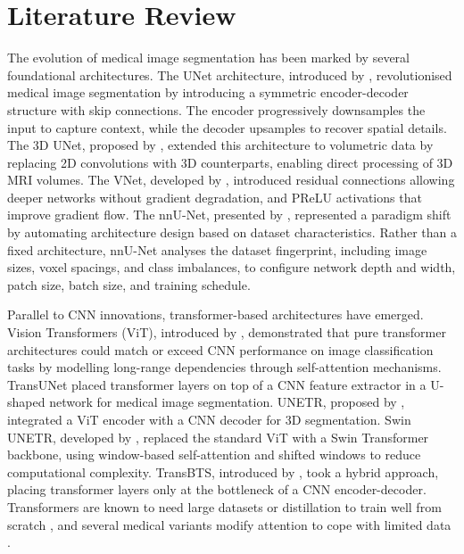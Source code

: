 \documentclass[a4paper,fleqn]{cas-sc}
\begin{document}
\section{Literature Review}
\label{sec:lit}

The evolution of medical image segmentation has been marked by several foundational architectures. The UNet architecture, introduced by \citet{ronneberger2015}, revolutionised medical image segmentation by introducing a symmetric encoder-decoder structure with skip connections. The encoder progressively downsamples the input to capture context, while the decoder upsamples to recover spatial details. The 3D UNet, proposed by \citet{cicek2016}, extended this architecture to volumetric data by replacing 2D convolutions with 3D counterparts, enabling direct processing of 3D MRI volumes. The VNet, developed by \citet{milletari2016}, introduced residual connections allowing deeper networks without gradient degradation, and PReLU activations that improve gradient flow. The nnU-Net, presented by \citet{isensee2021}, represented a paradigm shift by automating architecture design based on dataset characteristics. Rather than a fixed architecture, nnU-Net analyses the dataset fingerprint, including image sizes, voxel spacings, and class imbalances, to configure network depth and width, patch size, batch size, and training schedule.

Parallel to CNN innovations, transformer-based architectures have emerged. Vision Transformers (ViT), introduced by \citet{dosovitskiy2021}, demonstrated that pure transformer architectures could match or exceed CNN performance on image classification tasks by modelling long-range dependencies through self-attention mechanisms. TransUNet \citep{chen2024} placed transformer layers on top of a CNN feature extractor in a U-shaped network for medical image segmentation. UNETR, proposed by \citet{hatamizadeh2022unetr}, integrated a ViT encoder with a CNN decoder for 3D segmentation. Swin UNETR, developed by \citet{hatamizadeh2022swin}, replaced the standard ViT with a Swin Transformer backbone, using window-based self-attention and shifted windows to reduce computational complexity. TransBTS, introduced by \citet{wang2021}, took a hybrid approach, placing transformer layers only at the bottleneck of a CNN encoder-decoder. Transformers are known to need large datasets or distillation to train well from scratch \citep{touvron2021}, and several medical variants modify attention to cope with limited data \citep{valanarasu2021,cao2023}.
\end{document}
